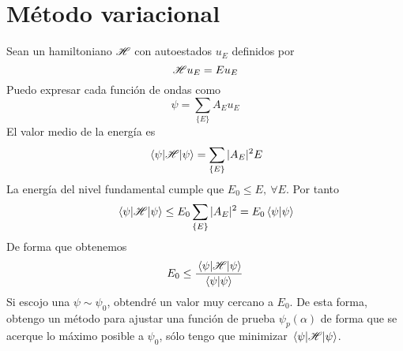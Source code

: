 \section{Método variacional}
Sean un hamiltoniano $ \mathscr{H} $ con autoestados $u_E$ definidos por
\begin{equation}
   \mathscr{H}  u_E = E  u_E
\end{equation}
Puedo expresar cada función de ondas como
\begin{equation}
  \psi = \sum_{\{E\}} A_E u_E
\end{equation}
El valor medio de la energía es
\begin{equation}
  \ev{ \Ham }{\psi} = \sum_{\{E\}} |A_E|^2 E
\end{equation}
La energía del nivel fundamental cumple que $E_0 \leq E,\ \forall E$.
Por tanto
\begin{equation}
  \ev{ \Ham }{\psi} \leq E_0 \sum_{\{E\}} |A_E|^2 = E_0 \braket{\psi}{\psi}
\end{equation}
De forma que obtenemos
\begin{equation}
  E_0 \leq \frac{\ev{ \Ham }{\psi}}{\braket{\psi}{\psi}}
\end{equation}
Si escojo una $\psi \sim \psi_0$, obtendré un valor muy cercano a
$E_0$. De esta forma, obtengo un método para ajustar una función de
prueba $\psi_p(\alpha)$ de forma que se acerque lo máximo posible a
$\psi_0$, sólo tengo que minimizar $\ev{ \Ham }{\psi}$.

